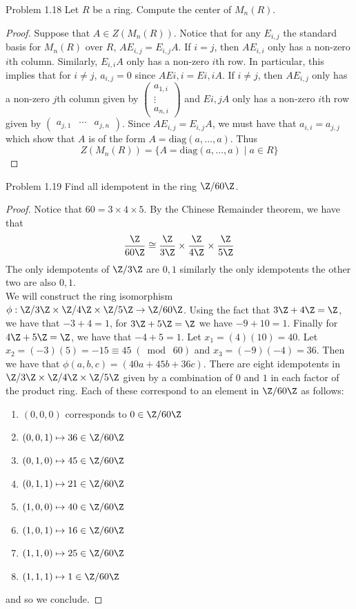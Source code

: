 \documentclass[a4paper]{article}
\begin{document}
\begin{ex}{Problem 1.18}{} Let $R$ be a ring. Compute the center of $M_n(R)$. 
\begin{proof}
Suppose that $A\in Z(M_n(R))$. Notice that for any $E_{i,j}$ the standard basis for $M_n(R)$ over $R$, $AE_{i,j}=E_{i,j}A$. If $i=j$, then $AE_{i,i}$ only has a non-zero $i$th column. Similarly, $E_{i,i}A$ only has a non-zero $i$th row. In particular, this implies that for $i\neq j$, $a_{i,j}=0$ since $AE{i,i}=E{i,i}A$. If $i\neq j$, then $AE_{i,j}$ only has a non-zero $j$th column given by $\begin{pmatrix}
a_{1,i}\\\vdots\\ a_{n,i}
\end{pmatrix}$ and $E{i,j}A$ only has a non-zero $i$th row given by $\begin{pmatrix}
a_{j,1} & \cdots & a_{j,n}
\end{pmatrix}$. Since $AE_{i,j}=E_{i,j}A$, we must have that $a_{i,i}=a_{j,j}$ which show that $A$ is of the form $A=\text{diag}(a,\dots,a)$. Thus $$Z(M_n(R))=\{A=\text{diag}(a,\dots,a)\;|\;a\in R\}$$
\end{proof}
\end{ex}

\begin{ex}{Problem 1.19}{} Find all idempotent in the ring $\Z/60\Z$. 
\begin{proof}
Notice that $60=3\times 4\times 5$. By the Chinese Remainder theorem, we have that $$\frac{\Z}{60\Z}\cong\frac{\Z}{3\Z}\times\frac{\Z}{4\Z}\times\frac{\Z}{5\Z}$$ The only idempotents of $\Z/3\Z$ are $0,1$ similarly the only idempotents the other two are also $0,1$. \\

We will construct the ring isomorphism $\phi:\Z/3\Z\times\Z/4\Z\times\Z/5\Z\to\Z/60\Z$. Using the fact that $3\Z+4\Z=\Z$, we have that $-3+4=1$, for $3\Z+5\Z=\Z$ we have $-9+10=1$. Finally for $4\Z+5\Z=\Z$, we have that $-4+5=1$. Let $x_1=(4)(10)=40$. Let $x_2=(-3)(5)=-15\equiv 45\;(\bmod\;60)$ and $x_3=(-9)(-4)=36$. Then we have that $\phi(a,b,c)=(40a+45b+36c)$. There are eight idempotents in $\Z/3\Z\times\Z/4\Z\times\Z/5\Z$ given by a combination of $0$ and $1$ in each factor of the product ring. Each of these correspond to an element in $\Z/60\Z$ as follows: 
\begin{enumerate}
\item $(0,0,0)$ corresponds to $0\in\Z/60\Z$
\item $(0,0,1)\mapsto 36\in\Z/60\Z$
\item $(0,1,0)\mapsto 45\in\Z/60\Z$
\item $(0,1,1)\mapsto 21\in\Z/60\Z$
\item $(1,0,0)\mapsto 40\in\Z/60\Z$
\item $(1,0,1)\mapsto 16\in\Z/60\Z$
\item $(1,1,0)\mapsto 25\in\Z/60\Z$
\item $(1,1,1)\mapsto 1\in\Z/60\Z$
\end{enumerate}
and so we conclude. 
\end{proof}
\end{ex}
\end{document}
